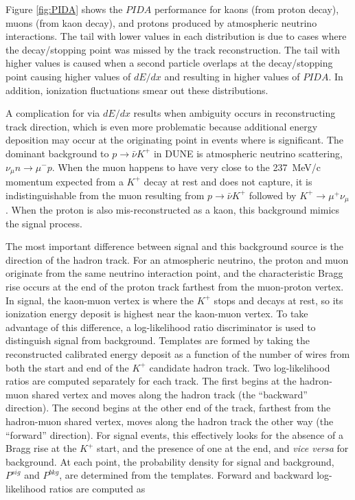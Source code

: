 Figure \ref{fig:PIDA} shows the $PIDA$ performance for kaons (from proton decay), muons (from kaon decay), and protons produced by atmospheric neutrino interactions. The tail with lower values in each distribution is due to cases where the decay/stopping point was missed by the track reconstruction. The tail with higher values is caused when a second particle overlaps at the decay/stopping point causing higher values of $dE/dx$ and resulting in higher values of $PIDA$. In addition, ionization fluctuations smear out these distributions.

A complication for  via $dE/dx$ results when ambiguity occurs in reconstructing track direction, which is even more problematic because additional energy deposition may occur at the originating point in events where  is significant.  The dominant background to $p\rightarrow \bar{\nu} K^{+}$ in DUNE is atmospheric neutrino  
scattering, $\nu_{\mu} n \rightarrow \mu^{-} p$.  When the muon happens to have very close
to the 237~MeV/c momentum expected from a $K^{+}$ decay at rest and does not capture, it is indistinguishable from the muon resulting from $p\rightarrow \bar{\nu} K^{+}$ followed by $K^{+} \rightarrow \mu^{+}\nu_{\mu}$. When
the proton is also mis-reconstructed as a kaon, this background mimics the signal process.  

The most important difference between signal and this background source is the direction of the hadron track. For an atmospheric neutrino, the proton and muon originate from the same neutrino interaction point, and the characteristic Bragg rise occurs at the end of the proton track farthest from the muon-proton vertex. In signal, the kaon-muon vertex is where the $K^{+}$ stops and decays at rest, so its ionization energy deposit is highest near the kaon-muon vertex.  To take advantage of this difference, a log-likelihood ratio discriminator is used to distinguish signal from background.  Templates are formed by taking the reconstructed calibrated energy deposit as a function of the number of wires from both the start and end of the $K^{+}$ candidate hadron track. 
Two log-likelihood ratios are computed separately for each track. The first begins at the hadron-muon shared vertex and moves along the hadron track (the ``backward'' direction). The second begins at the other end of the track, farthest from the hadron-muon shared vertex, moves along the hadron track the other way (the ``forward'' direction). For signal events, this effectively looks for the absence of a Bragg rise at the $K^{+}$ start, and the presence of one at the end, and {\it vice versa}
for background.  At each point, the probability density for signal and background, $P^{sig}$ and $P^{bkg}$, are determined from the templates. Forward and backward log-likelihood ratios are computed as

